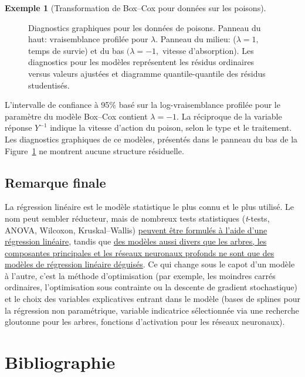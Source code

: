 \documentclass[
  11pt,
  letterpaper,
]{scrbook}
\theoremstyle{plain}
\theoremstyle{plain}
\theoremstyle{definition}
\newtheorem{example}{Exemple}[chapter]
\theoremstyle{definition}
\theoremstyle{remark}
\begin{document}
\begin{example}[Transformation de Box--Cox pour données sur les
poisons]
\begin{figure}[ht!]
{}

\caption{\label{fig-poisonplots}Diagnostics graphiques pour les données
de poisons. Panneau du haut: vraisemblance profilée pour \(\lambda.\)
Panneau du milieu: (\(\lambda=1,\) temps de survie) et du bas
\((\lambda=-1,\) vitesse d'absorption). Les diagnostics pour les modèles
représentent les résidus ordinaires versus valeurs ajustées et diagramme
quantile-quantile des résidus studentisés.}

\end{figure}%

L'intervalle de confiance à 95\% basé sur la log-vraisemblance profilée
pour le paramètre du modèle Box--Cox contient \(\lambda=-1.\) La
réciproque de la variable réponse \(Y^{-1}\) indique la vitesse d'action
du poison, selon le type et le traitement. Les diagnostics graphiques de
ce modèles, présentés dans le panneau du bas de la
Figure~\ref{fig-poisonplots} ne montrent aucune structure résiduelle.

\end{example}

\section{Remarque finale}\label{remarque-finale}

La régression linéaire est le modèle statistique le plus connu et le
plus utilisé. Le nom peut sembler réducteur, mais de nombreux tests
statistiques (\emph{t}-tests, ANOVA, Wilcoxon, Kruskal--Wallis)
\href{https://lindeloev.github.io/tests-as-linear/linear_tests_cheat_sheet.pdf}{peuvent
être formulés à l'aide d'une régression linéaire}, tandis que
\href{https://threadreaderapp.com/thread/1286420597505892352.html}{des
modèles aussi divers que les arbres, les composantes principales et les
réseaux neuronaux profonds ne sont que des modèles de régression
linéaire déguisés}. Ce qui change sous le capot d'un modèle à l'autre,
c'est la méthode d'optimisation (par exemple, les moindres carrés
ordinaires, l'optimisation sous contrainte ou la descente de gradient
stochastique) et le choix des variables explicatives entrant dans le
modèle (bases de splines pour la régression non paramétrique, variable
indicatrice sélectionnée via une recherche gloutonne pour les arbres,
fonctions d'activation pour les réseaux neuronaux).


\chapter*{Bibliographie}\label{bibliographie}
\end{document}
